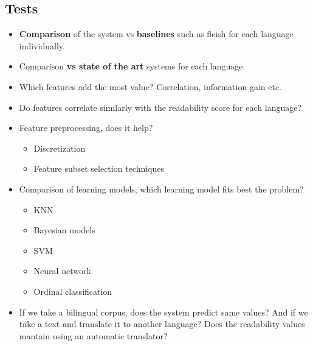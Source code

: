 \documentclass[12pt]{article}
\begin{document}
\subsection{Tests}

\begin{itemize}
\item \textbf{Comparison} of the system vs \textbf{baselines} such as fleish for each language individually.

\item Comparison \textbf{vs state of the art} systems for each language.

\item Which features add the most value? Correlation, information gain etc.

\item Do features correlate similarly with the readability score for each language?

\item Feature preprocessing, does it help?
	\begin{itemize}
	\item Discretization
	\item Feature subset selection techniques
	\end{itemize}
	
\item Comparison of learning models, which learning model fits best the problem?
	\begin{itemize}
	\item KNN
	\item Bayesian models
	\item SVM
	\item Neural network
	\item Ordinal classification
	\end{itemize}

\item If we take a bilingual corpus, does the system predict same values? And if we take a text and translate it to another language? Does the readability values mantain using an automatic translator?
\end{itemize}
\end{document}
